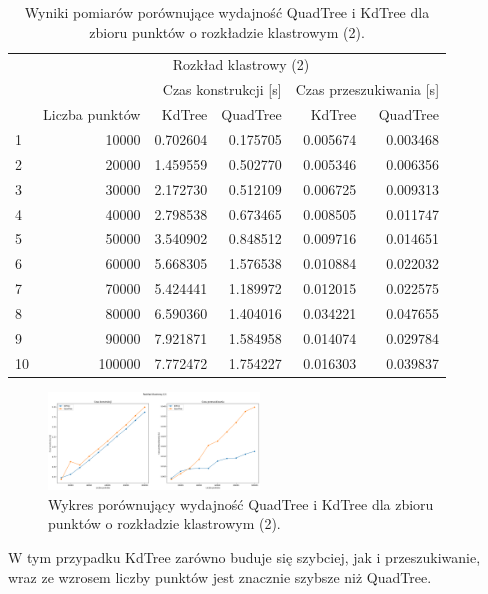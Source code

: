 \documentclass{lab}
\begin{document}
\begin{table}[H]
\centering
\begin{tabular}{lrrrrr}
  \toprule
   & \multicolumn{5}{c}{Rozkład klastrowy (2)} \\
   &  & \multicolumn{2}{r}{Czas konstrukcji [s]} & \multicolumn{2}{r}{Czas przeszukiwania [s]} \\
   & Liczba punktów & KdTree & QuadTree & KdTree & QuadTree \\
  \midrule
  1 & 10000 & 0.702604 & 0.175705 & 0.005674 & 0.003468 \\
  2 & 20000 & 1.459559 & 0.502770 & 0.005346 & 0.006356 \\
  3 & 30000 & 2.172730 & 0.512109 & 0.006725 & 0.009313 \\
  4 & 40000 & 2.798538 & 0.673465 & 0.008505 & 0.011747 \\
  5 & 50000 & 3.540902 & 0.848512 & 0.009716 & 0.014651 \\
  6 & 60000 & 5.668305 & 1.576538 & 0.010884 & 0.022032 \\
  7 & 70000 & 5.424441 & 1.189972 & 0.012015 & 0.022575 \\
  8 & 80000 & 6.590360 & 1.404016 & 0.034221 & 0.047655 \\
  9 & 90000 & 7.921871 & 1.584958 & 0.014074 & 0.029784 \\
  10 & 100000 & 7.772472 & 1.754227 & 0.016303 & 0.039837 \\
  \bottomrule
  \end{tabular}
\caption{Wyniki pomiarów porównujące wydajność QuadTree i KdTree dla zbioru punktów o rozkładzie klastrowym (2).}
\label{tab:cluster_time_2}
\end{table}

\begin{figure}[H]
  \centering
  \includegraphics[width=0.5\textwidth]{resources/cluster_graph_2.png}
  \caption{Wykres porównujący wydajność QuadTree i KdTree dla zbioru punktów o rozkładzie klastrowym (2).}
  \label{fig:cluster_graph_2}
\end{figure}

W tym przypadku KdTree zarówno buduje się szybciej, jak i przeszukiwanie, wraz ze wzrosem liczby punktów jest znacznie szybsze niż QuadTree.
\end{document}
